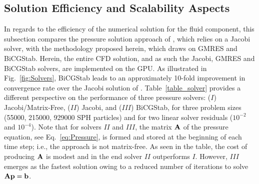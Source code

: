 

\subsection{Solution Efficiency and Scalability Aspects}
\label{subsec:convergence}
In regards to the efficiency of the numerical solution for the fluid component, this subsection compares the pressure solution approach of \cite{ihmsen2014implicit}, which relies on a Jacobi solver, with the methodology proposed herein, which draws on GMRES and BiCGStab. Herein, the entire CFD solution, and as such the Jacobi, GMRES and BiCGStab solvers, are implemented on the GPU. As illustrated in Fig.~\ref{fig:Solvers}, BiCGStab leads to an approximately 10-fold improvement in convergence rate over the Jacobi solution of \cite{ihmsen2014implicit}. Table~\ref{table_solver} provides a different perspective on the performance of three pressure solvers: ($I$) Jacobi/Matrix-Free, ($II$) Jacobi, and ($III$) BiCGStab, for three problem sizes (\num{55000}, \num{215000}, \num{929000} SPH particles) and for two linear solver residuals ($10^{-2}$ and $10^{-4}$).  Note that for solvers $II$ and $III$, the matrix ${\bf A}$ of the pressure equation, see Eq.~\ref{eq:Pressure}, is formed and stored at the beginning of each time step; i.e., the approach is not matrix-free. As seen in the table, the cost of producing ${\bf A}$ is modest and in the end solver $II$ outperforms $I$. However, $III$ emerges as the fastest solution owing to a reduced number of iterations to solve $\mathbf{A} {\bf p}={\bf b}$.



